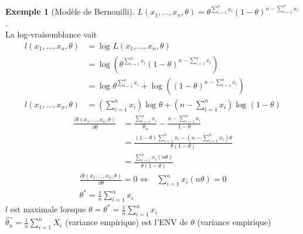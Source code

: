 \documentclass{article}
\theoremstyle{plain}%
\theoremstyle{definition}
\newtheorem{exmp}{Exemple}[section]
\theoremstyle{remark}
\begin{document}
\begin{exmp}[Modèle de Bernouilli]
    $ L(x_1, \dots, x_n, \theta ) = \theta ^{\sum_{i=1}^{n}x_i} (1-\theta )^{n-\sum_{i=1}^{n}x_i} $. \\
    La log-vraisemblance vait \begin{align*}
        l(x_1, \dots, x_n, \theta ) &= \log_{} L(x_1, \dots, x_n, \theta )\\
        &= \log(\theta ^{\sum_{i=1}^{n}x_i} (1-\theta )^{n-\sum_{i=1}^{n}x_i}) \\
        &= \log_{}\theta ^{\sum_{i=1}^{n}x_i} + \log_{} ((1-\theta )^{n-\sum_{i=1}^{n}x_i}) \\
        l(x_1, \dots, x_n, \theta ) &= (\sum_{i=1}^{n}x_i) \log_{} \theta + (n-\sum_{i=1}^{n}x_i)   \log_{} (1-\theta) 
    \end{align*} 
    \begin{align*}
        \frac{\partial l(x_1, \dots, x_n, \theta )}{ \partial \theta } &= \frac{\sum_{i=1}^{n} x_i}{\theta _n}- \frac{n-\sum_{i=1}^{n}x_i}{1-\theta } \\
        &= \frac{(1-\theta) \sum_{i=1}^{n}x_i - (n-\sum_{i=1}^{n}x_i) \theta}{\theta (1-\theta )} \\ 
        &= \frac{\sum_{i=1}^{n}x_i ( n \theta )}{\theta (1-\theta )}
    \end{align*}
    \begin{align*}
        \frac{\partial l(x_1, \dots, x_n, \theta )}{ \partial \theta } = 0 \Leftrightarrow &\sum_{i=1}^{n}x_i ( n \theta ) = 0 \\
        \theta ^* = \frac{1}{n}\sum_{i=1}^{n}x_i
    \end{align*}
    $ l $ est maximale lorsque $ \theta = \theta ^* = \frac{1}{n}\sum_{i=1}^{n}x_i$ \\
    $ \hat{\theta _n} = \frac{1}{n}\sum_{i=1}^{n}X_i $ (variance empirique) est l'ENV de $ \theta  $ (variance empirique)
\end{exmp}
\end{document}
